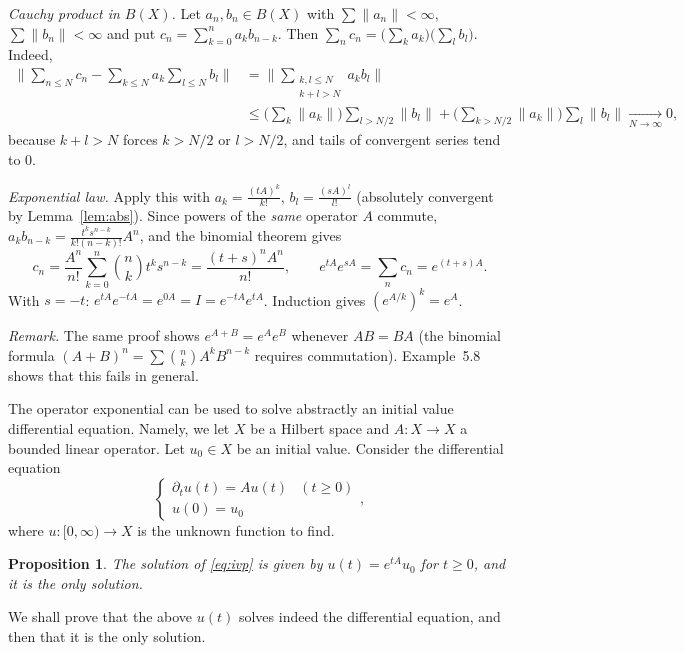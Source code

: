 \documentclass[11pt,a4paper]{article}
\numberwithin{equation}{section}
\theoremstyle{plain}
\newtheorem{proposition}[theorem]{Proposition}
\theoremstyle{definition}
\theoremstyle{plain}
\theoremstyle{definition}
\begin{document}
\begin{addition}
\emph{Cauchy product in $B(X)$.} Let $a_n,b_n\in B(X)$ with $\sum\|a_n\|<\infty$,
$\sum\|b_n\|<\infty$ and put $c_n=\sum_{k=0}^na_kb_{n-k}$. Then
$\sum_nc_n=\big(\sum_ka_k\big)\big(\sum_lb_l\big)$. Indeed,
\begin{align*}
\Big\|\sum_{n\le N}c_n-\sum_{k\le N}a_k\sum_{l\le N}b_l\Big\|
&=\Big\|\sum_{\substack{k,l\le N\\k+l>N}}a_kb_l\Big\|\\
&\le\Big(\sum_k\|a_k\|\Big)\sum_{l>N/2}\|b_l\|+\Big(\sum_{k>N/2}\|a_k\|\Big)\sum_l\|b_l\|\xrightarrow[N\to\infty]{}0,
\end{align*}
because $k+l>N$ forces $k>N/2$ or $l>N/2$, and tails of convergent series tend to $0$.

\emph{Exponential law.} Apply this with $a_k=\frac{(tA)^k}{k!}$, $b_l=\frac{(sA)^l}{l!}$
(absolutely convergent by Lemma~\ref{lem:abs}). Since powers of the \emph{same} operator
$A$ commute, $a_kb_{n-k}=\frac{t^ks^{n-k}}{k!(n-k)!}A^n$, and the binomial theorem gives
\[
c_n=\frac{A^n}{n!}\sum_{k=0}^n\binom nkt^ks^{n-k}=\frac{(t+s)^nA^n}{n!},\qquad
e^{tA}e^{sA}=\sum_nc_n=e^{(t+s)A}.
\]
With $s=-t$: $e^{tA}e^{-tA}=e^{0A}=I=e^{-tA}e^{tA}$. Induction gives $(e^{A/k})^k=e^{A}$.

\emph{Remark.} The same proof shows $e^{A+B}=e^Ae^B$ whenever $AB=BA$ (the binomial
formula $(A+B)^n=\sum\binom nkA^kB^{n-k}$ requires commutation). Example~5.8 shows that this
fails in general.
\end{addition}

The operator exponential can be used to solve abstractly an initial value differential
equation. Namely, we let $X$ be a Hilbert space and $A:X\to X$ a bounded linear operator.
Let $u_0\in X$ be an initial value. Consider the differential equation
\begin{equation}\label{eq:ivp}
\begin{cases}\partial_tu(t)=Au(t)&(t\ge0)\\u(0)=u_0\end{cases},
\end{equation}
where $u:[0,\infty)\to X$ is the unknown function to find.

\begin{proposition}\label{prop:ivp}
The solution of \eqref{eq:ivp} is given by $u(t)=e^{tA}u_0$ for $t\geqslant0$, and it is the
only solution.
\end{proposition}

We shall prove that the above $u(t)$ solves indeed the differential equation, and then
that it is the only solution.
\end{document}
